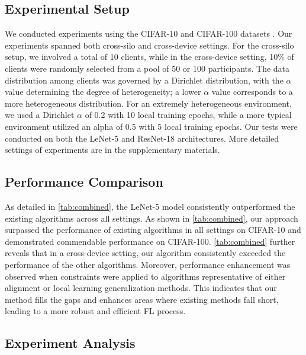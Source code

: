 \documentclass{article}
\theoremstyle{plain}
\theoremstyle{definition}
\theoremstyle{remark}
\begin{document}
\subsection{Experimental Setup}
We conducted experiments using the CIFAR-10 and CIFAR-100 datasets \cite{cifar}. Our experiments spanned both cross-silo and cross-device settings. For the cross-silo setup, we involved a total of 10 clients, while in the cross-device setting, 10\% of clients were randomly selected from a pool of 50 or 100 participants. The data distribution among clients was governed by a Dirichlet distribution, with the $\alpha$ value determining the degree of heterogeneity; a lower $\alpha$ value corresponds to a more heterogeneous distribution. For an extremely heterogeneous environment, we used a Dirichlet $\alpha$ of 0.2 with 10 local training epochs, while a more typical environment utilized an alpha of 0.5 with 5 local training epochs. Our tests were conducted on both the LeNet-5 and ResNet-18 architectures.%
More detailed settings of experiments are in the supplementary materials. 

\subsection{Performance Comparison}
As detailed in \cref{tab:combined}, the LeNet-5 model consistently outperformed the existing algorithms across all settings. As shown in \cref{tab:combined}, our approach surpassed the performance of existing algorithms in all settings on CIFAR-10 and demonstrated commendable performance on CIFAR-100. \cref{tab:combined} further reveals that in a cross-device setting, our algorithm consistently exceeded the performance of the other algorithms.  Moreover, performance enhancement was observed when constraints were applied to algorithms representative of either alignment or local learning generalization methods.  This indicates that our method fills the gaps and enhances areas where existing methods fall short, leading to a more robust and efficient FL process.

\subsection{Experiment Analysis}
\end{document}
